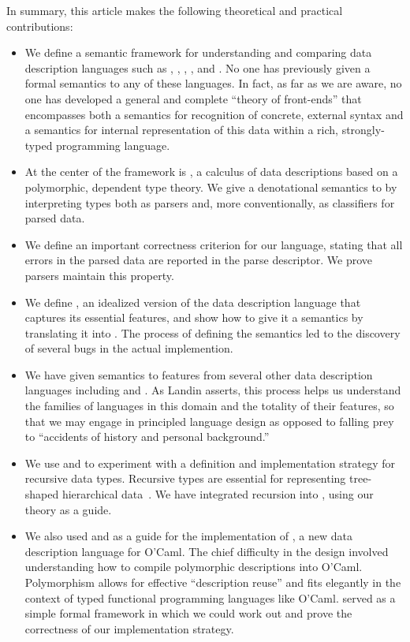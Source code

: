 In summary, this article makes the following theoretical and practical
contributions:
%
\begin{itemize}
\item We define a semantic framework for understanding and comparing data description languages such as \padsc{}, \padsml{},
\packettypes{}, \datascript{}, and \blt{}.
No one has previously given a formal semantics to any of these 
languages.  In fact, as far as we are aware, no one has developed 
a general and complete ``theory of front-ends'' 
that encompasses 
both a semantics for recognition of concrete, external syntax and 
a semantics for internal representation of this data within a
rich, strongly-typed programming language.

\item At the center of the framework is \ddc{},
a calculus of data descriptions based on a polymorphic, dependent type theory.
We give a denotational semantics
to \ddc{} by interpreting
types both as parsers and, more conventionally, 
as classifiers for parsed data. 

\item We define an important correctness criterion for our language,
stating that all errors in the parsed data are reported in the parse 
descriptor.  We prove \ddc{} parsers maintain this property.

\item We define \ipads{}, an idealized
version of the \padsc{} data description language
that captures its essential features,
and show how to give it a semantics by translating it into \ddc{}.  
The process of defining the semantics led to the
discovery of several bugs in the actual implemention.

\item We have given semantics to features from several other data description
languages including \packettypes{} and \datascript{}.  As Landin asserts, 
this process helps us understand the families of languages in this domain
and the totality of their features, so that we may engage in principled
language design
as opposed to falling prey to ``accidents of history and personal background.''

\item We use \ipads{} and \ddc{} to experiment with 
a definition and implementation strategy for recursive data types.  
Recursive types are essential for representing 
tree-shaped hierarchical
data~\cite{geneontology,newick}.  
We have integrated recursion into \padsc{},
using our theory as a guide. 

\item We also used \ipads{} and \ddc{} as a guide for the 
implementation of \padsml{},
a new data description language for O'Caml.  The chief difficulty
in the design involved understanding how to compile
polymorphic descriptions into O'Caml.  Polymorphism allows for effective
``description reuse'' and fits elegantly in the context of
typed functional programming languages like O'Caml.  \ddc{} served as
a simple formal framework in which we could work out and prove the
correctness of our implementation strategy.
\end{itemize}

